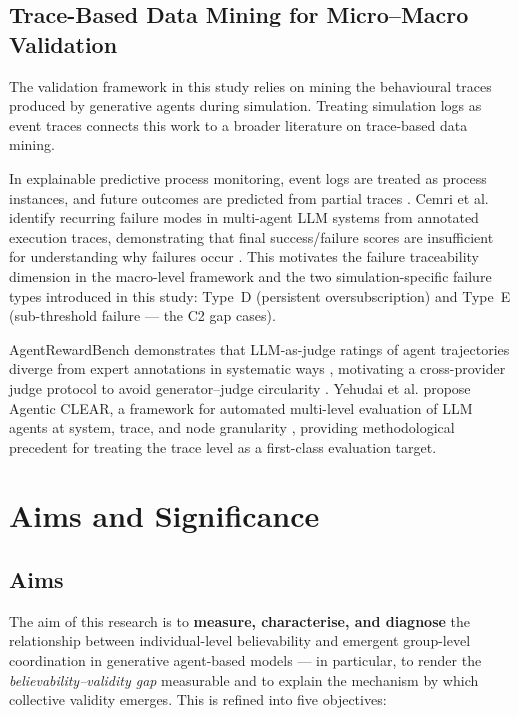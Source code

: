 \documentclass[11pt]{article}
\begin{document}
\subsection{Trace-Based Data Mining for Micro--Macro Validation}
The validation framework in this study relies on mining the behavioural traces produced by generative agents during simulation. Treating simulation logs as event traces connects this work to a broader literature on trace-based data mining.

In explainable predictive process monitoring, event logs are treated as process instances, and future outcomes are predicted from partial traces \cite{galanti2020explainable}. Cemri et al. identify recurring failure modes in multi-agent LLM systems from annotated execution traces, demonstrating that final success/failure scores are insufficient for understanding why failures occur \cite{cemri2025fails}. This motivates the failure traceability dimension in the macro-level framework and the two simulation-specific failure types introduced in this study: Type~D (persistent oversubscription) and Type~E (sub-threshold failure --- the C2 gap cases).

AgentRewardBench demonstrates that LLM-as-judge ratings of agent trajectories diverge from expert annotations in systematic ways \cite{pan2025agentrewardbench}, motivating a cross-provider judge protocol to avoid generator--judge circularity \cite{zheng2023judging}. Yehudai et al. propose Agentic CLEAR, a framework for automated multi-level evaluation of LLM agents at system, trace, and node granularity \cite{yehudai2026clear}, providing methodological precedent for treating the trace level as a first-class evaluation target.

\section{Aims and Significance}

\subsection{Aims}
The aim of this research is to \textbf{measure, characterise, and diagnose} the relationship between individual-level believability and emergent group-level coordination in generative agent-based models --- in particular, to render the \emph{believability--validity gap} measurable and to explain the mechanism by which collective validity emerges. This is refined into five objectives:
\end{document}
